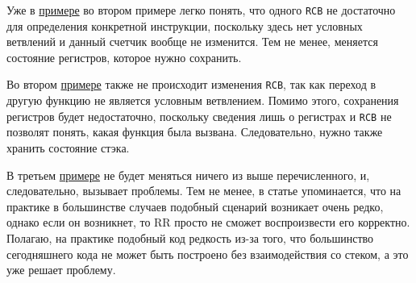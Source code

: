 Уже в \hyperref[lst:good-loop]{примере} во втором примере легко понять, что одного \texttt{RCB} не достаточно для определения конкретной инструкции, 
поскольку здесь нет условных ветвлений и данный счетчик вообще не изменится. Тем не менее, меняется состояние регистров, которое нужно сохранить.

Во втором \hyperref[lst:multiple-calls]{примере} также не происходит изменения \texttt{RCB}, 
так как переход в другую функцию не является условным ветвлением.
Помимо этого, сохранения регистров будет недостаточно, поскольку сведения лишь о регистрах и \texttt{RCB} не позволят понять, какая функция была вызвана.
Следовательно, нужно также хранить состояние стэка.

В третьем \hyperref[lst:bad-loop]{примере} не будет меняться ничего из выше перечисленного, и, следовательно, вызывает проблемы. 
Тем не менее, в статье \cite{rr-paper} упоминается, что на практике в большинстве случаев подобный сценарий возникает очень редко, 
однако если он возникнет, то RR просто не сможет воспроизвести его корректно.
Полагаю, на практике подобный код редкость из-за того, что большинство сегодняшнего кода не может быть построено без взаимодействия со стеком, а это уже решает проблему.